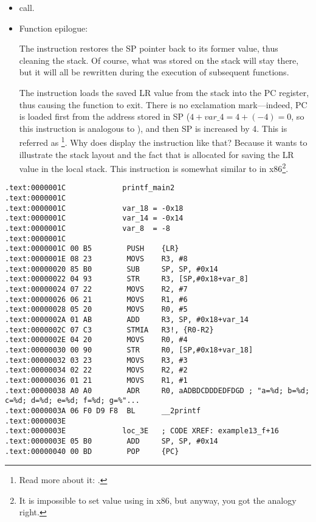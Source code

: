 \begin{itemize}
\item \printf call.

\item Function epilogue:

The  instruction restores the \ac{SP} pointer back to its former value, thus cleaning the stack.
Of course, what was stored on the stack will stay there, but it will all be rewritten during the execution of subsequent functions.

The  instruction loads the saved \ac{LR} value from the stack into the \ac{PC} register, thus causing the function to exit.
There is no exclamation mark---indeed, \ac{PC} is loaded first from the address stored in \ac{SP} ($4+var\_4=4+(-4)=0$, so this instruction is analogous to ), and then \ac{SP} is increased by 4.
This is referred as \footnote{Read more about it: .}.
Why does \IDA display the instruction like that?
Because it wants to illustrate the stack layout and the fact that  is allocated for saving the \ac{LR} value in the local stack.
This instruction is somewhat similar to  in x86\footnote{It is impossible to set  value using \POP in x86, but anyway, you got the analogy right.}.

\end{itemize}

\myparagraph{\OptimizingKeilVI: \ThumbMode}

\begin{lstlisting}
.text:0000001C             printf_main2
.text:0000001C
.text:0000001C             var_18 = -0x18
.text:0000001C             var_14 = -0x14
.text:0000001C             var_8  = -8
.text:0000001C
.text:0000001C 00 B5        PUSH    {LR}
.text:0000001E 08 23        MOVS    R3, #8
.text:00000020 85 B0        SUB     SP, SP, #0x14
.text:00000022 04 93        STR     R3, [SP,#0x18+var_8]
.text:00000024 07 22        MOVS    R2, #7
.text:00000026 06 21        MOVS    R1, #6
.text:00000028 05 20        MOVS    R0, #5
.text:0000002A 01 AB        ADD     R3, SP, #0x18+var_14
.text:0000002C 07 C3        STMIA   R3!, {R0-R2}
.text:0000002E 04 20        MOVS    R0, #4
.text:00000030 00 90        STR     R0, [SP,#0x18+var_18]
.text:00000032 03 23        MOVS    R3, #3
.text:00000034 02 22        MOVS    R2, #2
.text:00000036 01 21        MOVS    R1, #1
.text:00000038 A0 A0        ADR     R0, aADBDCDDDEDFDGD ; "a=%d; b=%d; c=%d; d=%d; e=%d; f=%d; g=%"...
.text:0000003A 06 F0 D9 F8  BL      __2printf
.text:0000003E
.text:0000003E             loc_3E   ; CODE XREF: example13_f+16
.text:0000003E 05 B0        ADD     SP, SP, #0x14
.text:00000040 00 BD        POP     {PC}
\end{lstlisting}

